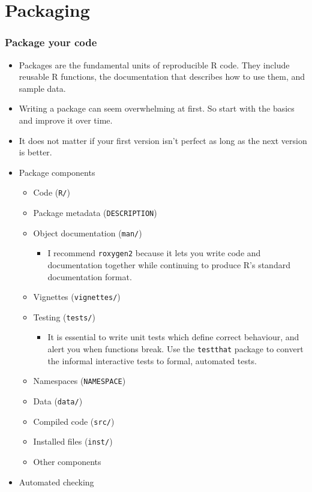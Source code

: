 \documentclass[10pt]{beamer}
\begin{document}
\section{Packaging}
\begin{frame}
  \frametitle{Package your code}
  \begin{itemize}
  \item Packages are the fundamental units of reproducible R code. They include reusable R
    functions, the documentation that describes how to use them, and sample data.
  \item Writing a package can seem overwhelming at first. So start with the basics and improve it over time.
  \item It does not matter if your first version isn’t perfect as long as the next version
    is better.

    \newpage

  \item Package components

    \begin{itemize}
    \item Code (\texttt{R/})
    \item Package metadata (\texttt{DESCRIPTION})
    \item Object documentation (\texttt{man/})

      \begin{itemize}
      \item I recommend \texttt{roxygen2} because it lets you write code and documentation
        together while continuing to produce R’s standard documentation format.
      \end{itemize}

    \item Vignettes (\texttt{vignettes/})
    \item Testing (\texttt{tests/})

      \begin{itemize}
      \item It is essential to write unit tests which define correct behaviour, and alert
        you when functions break. Use the \texttt{testthat} package to convert the
        informal interactive tests  to formal, automated tests.
      \end{itemize}
    \item Namespaces (\texttt{NAMESPACE})
    \item Data (\texttt{data/})
    \item Compiled code (\texttt{src/})
    \item Installed files (\texttt{inst/})
    \item Other components
    \end{itemize}
    \newpage
  \item Automated checking


\end{itemize}
\end{frame}
\end{document}
